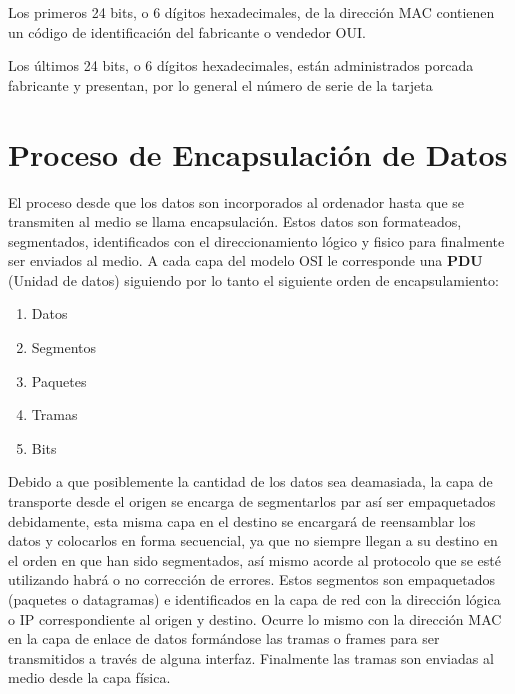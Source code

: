 \documentclass[12pt, fleqn]{report}                             %
\theoremstyle{break}                                            %
\begin{document}
            Los primeros 24 bits, o 6 dígitos hexadecimales, de la dirección MAC contienen un código de
            identificación del fabricante o vendedor OUI.

            Los últimos 24 bits, o 6 dígitos hexadecimales, están administrados porcada fabricante
            y presentan, por lo general el número de serie de la tarjeta



        \clearpage
        \section{Proceso de Encapsulación de Datos}

            El proceso desde que los datos son incorporados al ordenador hasta que se transmiten al medio
            se llama encapsulación. Estos datos son formateados, segmentados, identificados con el 
            direccionamiento lógico y fisico para finalmente ser enviados al medio. A cada capa del modelo
            OSI le corresponde una \textbf{PDU} (Unidad de datos) siguiendo por lo tanto el siguiente orden 
            de encapsulamiento:

            \begin{enumerate}
                \item Datos          
                \item Segmentos      
                \item Paquetes       
                \item Tramas         
                \item Bits           
            \end{enumerate}

            Debido a que posiblemente la cantidad de los datos sea deamasiada, la capa de transporte desde
            el origen se encarga de segmentarlos par así ser empaquetados debidamente, esta misma capa en el 
            destino se encargará de reensamblar los datos y colocarlos en forma secuencial, ya que no siempre
            llegan a su destino en el orden en que han sido segmentados, así mismo acorde al protocolo que se esté
            utilizando habrá o no corrección de errores. Estos segmentos son empaquetados (paquetes o datagramas) e 
            identificados en la capa de red con la dirección lógica o IP correspondiente al origen y destino. 
            Ocurre lo mismo con la dirección MAC en la capa de enlace de datos formándose las tramas o frames para ser
            transmitidos a través de alguna interfaz. Finalmente las tramas son enviadas al medio desde la capa física.
        
\end{document}

